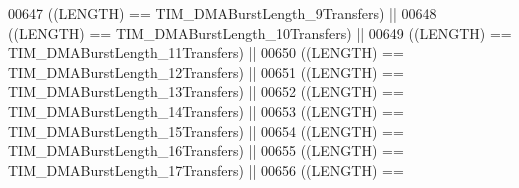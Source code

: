 \begin{DoxyCode}
00647                                    \textcolor{preprocessor}{(}\textcolor{preprocessor}{(}\textcolor{preprocessor}{LENGTH}\textcolor{preprocessor}{)} \textcolor{preprocessor}{==} 
      TIM_DMABurstLength_9Transfers\textcolor{preprocessor}{)} \textcolor{preprocessor}{||}
00648                                    \textcolor{preprocessor}{(}\textcolor{preprocessor}{(}\textcolor{preprocessor}{LENGTH}\textcolor{preprocessor}{)} \textcolor{preprocessor}{==} 
      TIM_DMABurstLength_10Transfers\textcolor{preprocessor}{)} \textcolor{preprocessor}{||}
00649                                    \textcolor{preprocessor}{(}\textcolor{preprocessor}{(}\textcolor{preprocessor}{LENGTH}\textcolor{preprocessor}{)} \textcolor{preprocessor}{==} 
      TIM_DMABurstLength_11Transfers\textcolor{preprocessor}{)} \textcolor{preprocessor}{||}
00650                                    \textcolor{preprocessor}{(}\textcolor{preprocessor}{(}\textcolor{preprocessor}{LENGTH}\textcolor{preprocessor}{)} \textcolor{preprocessor}{==} 
      TIM_DMABurstLength_12Transfers\textcolor{preprocessor}{)} \textcolor{preprocessor}{||}
00651                                    \textcolor{preprocessor}{(}\textcolor{preprocessor}{(}\textcolor{preprocessor}{LENGTH}\textcolor{preprocessor}{)} \textcolor{preprocessor}{==} 
      TIM_DMABurstLength_13Transfers\textcolor{preprocessor}{)} \textcolor{preprocessor}{||}
00652                                    \textcolor{preprocessor}{(}\textcolor{preprocessor}{(}\textcolor{preprocessor}{LENGTH}\textcolor{preprocessor}{)} \textcolor{preprocessor}{==} 
      TIM_DMABurstLength_14Transfers\textcolor{preprocessor}{)} \textcolor{preprocessor}{||}
00653                                    \textcolor{preprocessor}{(}\textcolor{preprocessor}{(}\textcolor{preprocessor}{LENGTH}\textcolor{preprocessor}{)} \textcolor{preprocessor}{==} 
      TIM_DMABurstLength_15Transfers\textcolor{preprocessor}{)} \textcolor{preprocessor}{||}
00654                                    \textcolor{preprocessor}{(}\textcolor{preprocessor}{(}\textcolor{preprocessor}{LENGTH}\textcolor{preprocessor}{)} \textcolor{preprocessor}{==} 
      TIM_DMABurstLength_16Transfers\textcolor{preprocessor}{)} \textcolor{preprocessor}{||}
00655                                    \textcolor{preprocessor}{(}\textcolor{preprocessor}{(}\textcolor{preprocessor}{LENGTH}\textcolor{preprocessor}{)} \textcolor{preprocessor}{==} 
      TIM_DMABurstLength_17Transfers\textcolor{preprocessor}{)} \textcolor{preprocessor}{||}
00656                                    \textcolor{preprocessor}{(}\textcolor{preprocessor}{(}\textcolor{preprocessor}{LENGTH}\textcolor{preprocessor}{)} \textcolor{preprocessor}{==} 

\end{DoxyCode}

